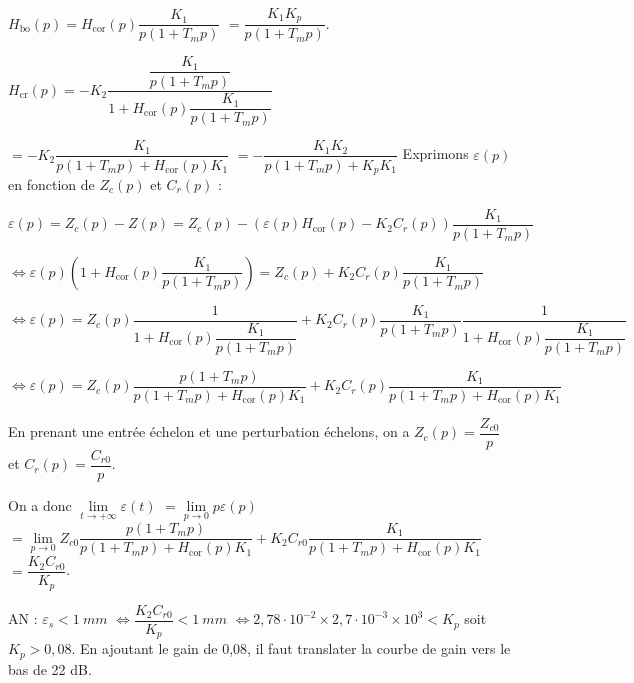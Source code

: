 \begin{corrigebox}
$H_{\text{bo}}(p) = H_{\text{cor}}(p) \dfrac{K_1}{p\left(1+T_m p\right)}$ $=  \dfrac{K_1 K_p}{p\left(1+T_m p\right)}$.

$H_{\text{cr}}(p)= -K_2\dfrac{\dfrac{K_1}{p\left(1+T_m p\right)}}{1+H_{\text{cor}}(p) \dfrac{K_1}{p\left(1+T_m p\right)}}$

$= -K_2\dfrac{K_1}{p\left(1+T_m p\right)+H_{\text{cor}}(p) K_1}$
$= -\dfrac{K_1K_2}{p\left(1+T_m p\right)+K_p K_1}$
Exprimons $\varepsilon(p)$ en fonction de $Z_c(p)$ et $C_{r}(p)$ :

$
\varepsilon(p)=Z_c(p)-Z(p) = Z_c(p)- \left(\varepsilon(p) H_{\text{cor}}(p)-   K_2 C_r(p)\right) \dfrac{K_1}{p\left(1+T_m p\right)}$

$\Leftrightarrow \varepsilon(p)\left(1 +  H_{\text{cor}}(p)\dfrac{K_1}{p\left(1+T_m p\right)} \right) 
= Z_c(p) + K_2 C_r(p) \dfrac{K_1}{p\left(1+T_m p\right)}$

$\Leftrightarrow \varepsilon(p)  = 
Z_c(p)\dfrac{1}{1 +  H_{\text{cor}}(p)\dfrac{K_1}{p\left(1+T_m p\right)}} 
+   K_2 C_r(p) \dfrac{K_1}{p\left(1+T_m p\right)} \dfrac{1}{1 +  H_{\text{cor}}(p)\dfrac{K_1}{p\left(1+T_m p\right)}}$

$\Leftrightarrow \varepsilon(p)  = 
Z_c(p)\dfrac{{p\left(1+T_m p\right)}}{{p\left(1+T_m p\right)} +  H_{\text{cor}}(p){K_1}} 
+  K_2 C_r(p)  \dfrac{K_1}{p\left(1+T_m p\right) +  H_{\text{cor}}(p){K_1}}$

En prenant une entrée échelon et une perturbation échelons, on a $Z_c(p) = \dfrac{Z_{c0}}{p}$ et 
$C_{r}(p) = \dfrac{C_{r0}}{p}$.

On a donc $\lim\limits_{t\to +\infty} \varepsilon(t) $
$=\lim\limits_{p\to 0} p\varepsilon(p)$
$=  \lim\limits_{p\to 0} Z_{c0}\dfrac{{p\left(1+T_m p\right)}}{{p\left(1+T_m p\right)} +  H_{\text{cor}}(p){K_1}} 
+   K_2 C_{r0}  \dfrac{K_1}{p\left(1+T_m p\right) +  H_{\text{cor}}(p){K_1}} $ 
$ =   \dfrac{K_2 C_{r0}}{ K_p}$.

AN : $\varepsilon_s < \SI{1}{mm}$
$\Leftrightarrow \dfrac{K_2 C_{r0}}{ K_p} < \SI{1}{mm}$  
$\Leftrightarrow 
2,78 \cdot 10^{-2} \times 2,7 \cdot 10^{-3} \times 10^3<  K_p$  soit $K_p >0,08$.
En ajoutant le gain de 0,08, il faut translater la courbe de gain vers le bas de 22 dB.


\end{corrigebox}
